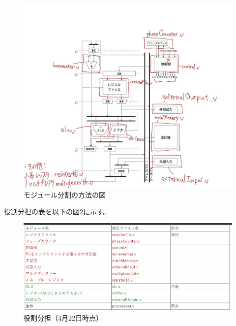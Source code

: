 \documentclass[a4j,titlepage]{jarticle}
\begin{document}
\begin{figure}[H]
    \begin{center}
    \includegraphics[scale = 0.22]{moduleSplit0422.jpg}
    \end{center}
    \caption{モジュール分割の方法の図}
    \label{moduleSplit0422}
\end{figure}

役割分担の表を以下の図\ref{rolesDivision0422}に示す。

\begin{figure}[H]
    \begin{center}
        \includegraphics[scale = 0.5]{rolesDivision0422.png}
    \end{center}
    \caption{役割分担（4月22日時点）}
    \label{rolesDivision0422}
\end{figure}
\end{document}
